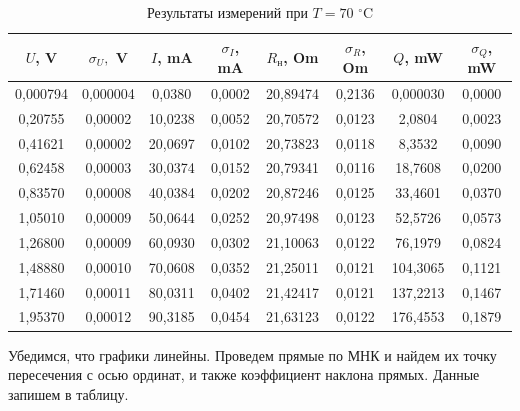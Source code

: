 \documentclass[a4paper,12pt]{article}
\begin{document}
\begin{table}[!ht]
    \centering
    \begin{tabular}{|c|c|c|c|c|c|c|c|}
    \hline
        $U$, V & $\sigma_U,$ V & $I$, mA & $\sigma_I$, mA & $R_н$, Om & $\sigma_R$, Om & $Q$, mW & $\sigma_Q$, mW \\ \hline
        0,000794 & 0,000004 & 0,0380 & 0,0002 & 20,89474 & 0,2136 & 0,000030 & 0,0000 \\ \hline
        0,20755 & 0,00002 & 10,0238 & 0,0052 & 20,70572 & 0,0123 & 2,0804 & 0,0023 \\ \hline
        0,41621 & 0,00002 & 20,0697 & 0,0102 & 20,73823 & 0,0118 & 8,3532 & 0,0090 \\ \hline
        0,62458 & 0,00003 & 30,0374 & 0,0152 & 20,79341 & 0,0116 & 18,7608 & 0,0200 \\ \hline
        0,83570 & 0,00008 & 40,0384 & 0,0202 & 20,87246 & 0,0125 & 33,4601 & 0,0370 \\ \hline
        1,05010 & 0,00009 & 50,0644 & 0,0252 & 20,97498 & 0,0123 & 52,5726 & 0,0573 \\ \hline
        1,26800 & 0,00009 & 60,0930 & 0,0302 & 21,10063 & 0,0122 & 76,1979 & 0,0824 \\ \hline
        1,48880 & 0,00010 & 70,0608 & 0,0352 & 21,25011 & 0,0121 & 104,3065 & 0,1121 \\ \hline
        1,71460 & 0,00011 & 80,0311 & 0,0402 & 21,42417 & 0,0121 & 137,2213 & 0,1467 \\ \hline
        1,95370 & 0,00012 & 90,3185 & 0,0454 & 21,63123 & 0,0122 & 176,4553 & 0,1879 \\ \hline
    \end{tabular}
    \caption{Результаты измерений при $T = 70$ $^\circ$C}
\end{table}

Убедимся, что графики линейны. Проведем прямые по МНК и найдем их точку пересечения с осью ординат, и также коэффициент наклона прямых. Данные запишем в таблицу.
\end{document}

